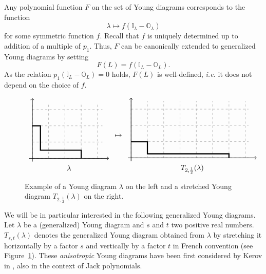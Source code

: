 \documentclass[11pt]{amsart}
\theoremstyle{plain}
\theoremstyle{remark}
\newcommand{\II}{\mathbb{I}}
\newcommand{\OO}{\mathbb{O}}
\begin{document}
Any polynomial function $F$ on the set of Young diagrams corresponds to the function
\[\lambda \mapsto f(\II_\lambda - \OO_\lambda) \]
for some symmetric function $f$. 
Recall that $f$ is uniquely determined up to addition of a multiple of $p_1$.
Thus, $F$ can be canonically extended to generalized Young diagrams by
setting
\[F(L) = f(\II_L - \OO_L).\]
As the relation $p_1(\II_L-\OO_L)=0$ holds, $F(L)$ is well-defined,
{\em i.e.} it does not depend on the choice of $f$.

\begin{figure}[tb]
    \[ \begin{array}{c}
        \begin{tikzpicture}[scale=0.8]
            \draw[dashed,gray] grid (4.3,3.4);
            \draw[->,thick] (-0.2,0) -- (4.7,0);
            \draw[->,thick] (0,-0.2) -- (0,3.7);
            \draw[ultra thick] (0,2) 
            -- (.5,2) 
            -- (.5,.5) 
            -- (3,.5) 
            -- (3,0) ;
        \end{tikzpicture}\\
        \lambda
    \end{array}
    \mapsto 
     \begin{array}{c}
        \begin{tikzpicture}[scale=0.8]

            \draw[dashed,gray] grid (7.2,3.5);
            \draw[->,thick] (-0.2,0) -- (7.7,0);
            \draw[->,thick] (0,-0.2) -- (0,3.7);

            \begin{scope}[xscale=2,yscale=.5]
                        \draw[ultra thick] (0,2) 
                        -- (.5,2) 
                        -- (.5,.5) 
                        -- (3,.5) 
                        -- (3,0) ;
            \end{scope}
        \end{tikzpicture}\\
        T_{2,\frac{1}{2}} (\lambda)
    \end{array}\]
    \caption{Example of a Young diagram $\lambda$ on the left and a stretched Young diagram $T_{2,\frac{1}{2}} (\lambda)$ on the right.}
    \label{FigStretching}
\end{figure}


We will be in particular interested in the following generalized Young diagrams.
Let $\lambda$ be a (generalized) Young diagram and $s$ and $t$ two positive real numbers.
$T_{s,t}(\lambda)$ denotes the generalized Young diagram obtained from $\lambda$ by stretching it
horizontally by a factor $s$ and vertically by a factor $t$ in French convention (see Figure~\ref{FigStretching}).
These \emph{anisotropic} Young diagrams have been first considered by Kerov in \cite{KerovAnisotropicYD},
also in the context of Jack polynomials.
\end{document}
